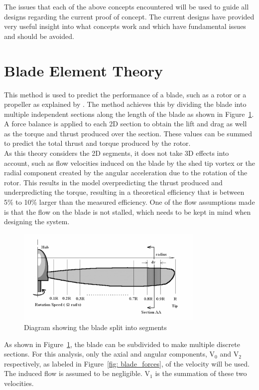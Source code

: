     The issues that each of the above concepts encountered will be used to guide all designs regarding the current proof of concept. The current designs have provided very useful insight into what concepts work and which have fundamental issues and should be avoided.

\section{Blade Element Theory}
This method is used to predict the performance of a blade, such as a rotor or a propeller as explained by \cite{blade_element_theory_2024}. The method achieves this by dividing the blade into multiple independent sections along the length of the blade as shown in Figure~\ref{fig: blade_segments}. A force balance is applied to each 2D section to obtain the lift and drag as well as the torque and thrust produced over the section. These values can be summed to predict the total thrust and torque produced by the rotor. \\
As this theory considers the 2D segments, it does not take 3D effects into account, such as flow velocities induced on the blade by the shed tip vortex or the radial component created by the angular acceleration due to the rotation of the rotor. This results in the model overpredicting the thrust produced and underpredicting the torque, resulting in a theoretical efficiency that is between 5\% to 10\% larger than the measured efficiency. One of the flow assumptions made is that the flow on the blade is not stalled, which needs to be kept in mind when designing the system.
\begin{figure}
    \centering
    \includegraphics[width =0.8\textwidth]{figs/Blade_Element.png}
    \caption[Segmented blade]{Diagram showing the blade split into segments \citep{blade_element_theory_2024}}
    \label{fig: blade_segments}
\end{figure}

As shown in Figure~\ref{fig: blade_segments}, the blade can be subdivided to make multiple discrete sections. For this analysis, only the axial and angular components, V\(_0\)  and V\(_2\) respectively, as labeled in Figure~\ref{fig: blade_forces}, of the velocity will be used. The induced flow is assumed to be negligible. V\(_1\) is the summation of these two velocities. 

